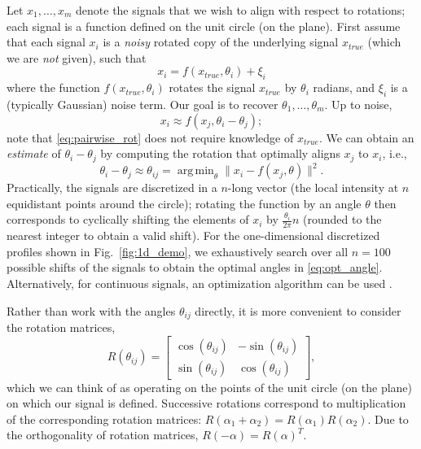 \documentclass{pnastwo}
\DeclareMathOperator*{\argmin}{arg\,min}
\newcommand{\fig}[0]{Fig.}
\begin{document}
\begin{article}
Let $ x_1, \dots, x_m$ denote the signals that we wish to align with respect to rotations;
each signal is a function defined on the unit circle (on the plane).
%
%
First assume that each signal $x_i$ is a {\it noisy} rotated copy of the underlying signal $x_{true}$
(which we are {\it not} given), such that
\begin{equation}
x_i = f(x_{true}, \theta_i) + \xi_i
\end{equation}
where the function $f(x_{true}, \theta_i)$ rotates the signal $x_{true}$ by $\theta_i$ radians, and $\xi_i$ is a (typically Gaussian) noise term.
%
Our goal is to recover $\theta_1, \dots, \theta_m$.
%
Up to noise,
\begin{equation} \label{eq:pairwise_rot}
x_i \approx f(x_j, \theta_i - \theta_j) ;
\end{equation}
note that \eqref{eq:pairwise_rot} does not require knowledge of $x_{true}$.
%
We can obtain an {\it estimate} of $\theta_i - \theta_j$ by computing the rotation that optimally aligns $x_j$ to $x_i$,
i.e., %
%
\begin{equation} \label{eq:opt_angle}
\theta_i - \theta_j \approx \theta_{ij} = \argmin_{\theta} \|x_i - f(x_j, \theta)\|^2.
\end{equation}
%
Practically, the signals are discretized in a $n$-long vector (the local intensity at $n$ equidistant points around the circle);
rotating the function by an angle $\theta$ then corresponds to cyclically shifting the elements of $x_i$
by $\frac{\theta_i}{2 \pi} n$ (rounded to the nearest integer to obtain a valid shift).
%
For the one-dimensional discretized profiles shown in \fig~\ref{fig:1d_demo}, we exhaustively search over all $n=100$ possible shifts of the signals to obtain the optimal angles in \eqref{eq:opt_angle}.
%
Alternatively, for continuous signals, an optimization algorithm
can be used \cite{ahuja2007template}.

Rather than work with the angles $\theta_{ij}$ directly, it is more convenient to consider the rotation matrices,
\begin{equation} \label{eq:R_theta}
R(\theta_{ij}) = \begin{bmatrix}
\cos(\theta_{ij}) & -\sin(\theta_{ij}) \\
\sin(\theta_{ij}) & \cos(\theta_{ij})
\end{bmatrix},
\end{equation}
which we can think of as operating on the points of the unit circle (on the plane) on which our signal is defined.
%
Successive rotations correspond to multiplication of the corresponding rotation matrices: $R(\alpha_1 + \alpha_2) = R(\alpha_1) R(\alpha_2)$.
%
Due to the orthogonality of rotation matrices, $R(-\alpha) = R(\alpha)^T$.


\end{article}
\end{document}
